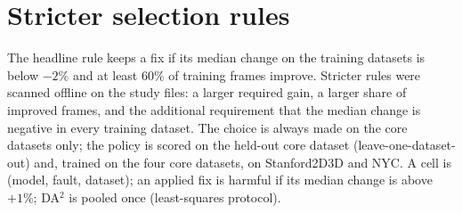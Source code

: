 \documentclass{article}
\begin{document}
\section{Stricter selection rules}\label{app:thresholds}
The headline rule keeps a fix if its median change on the training datasets is below $-2\%$ and at least $60\%$ of training frames improve. Stricter rules were scanned offline on the study files: a larger required gain, a larger share of improved frames, and the additional requirement that the median change is negative in every training dataset. The choice is always made on the core datasets only; the policy is scored on the held-out core dataset (leave-one-dataset-out) and, trained on the four core datasets, on Stanford2D3D and NYC. A cell is (model, fault, dataset); an applied fix is harmful if its median change is above $+1\%$; DA$^2$ is pooled once (least-squares protocol).
\end{document}
